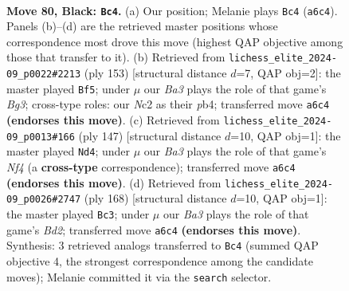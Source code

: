 \documentclass[11pt]{article}
\begin{document}
\clearpage

\begin{figure}[p]\centering
\begin{subfigure}{0.46\textwidth}\centering
\resizebox{\linewidth}{!}{%
\newchessgame
\chessboard[
  setfen={7k/8/b7/8/5B2/8/2n2P1K/8 b - - 6 80},
  showmover=false,
  pgfstyle=straightmove, color=movearrow, markmove={a6-c4}
]}
\caption{}
\end{subfigure}\hfill
\begin{subfigure}{0.46\textwidth}\centering
\resizebox{\linewidth}{!}{%
\newchessgame
\chessboard[
  setfen={8/4B3/3K2b1/1p6/1P6/8/8/k7 b - - 31 77},
  showmover=false,
  pgfstyle=straightmove, color=movearrow, markmove={g6-f5}
]}
\caption{}
\end{subfigure}
\\[4pt]
\begin{subfigure}{0.46\textwidth}\centering
\resizebox{\linewidth}{!}{%
\newchessgame
\chessboard[
  setfen={4K3/5B2/8/5n2/8/8/3k4/8 b - - 5 74},
  showmover=false,
  pgfstyle=straightmove, color=movearrow, markmove={f5-d4}
]}
\caption{}
\end{subfigure}\hfill
\begin{subfigure}{0.46\textwidth}\centering
\resizebox{\linewidth}{!}{%
\newchessgame
\chessboard[
  setfen={2b5/3k4/8/8/8/8/3B1K2/8 w - - 53 85},
  showmover=false,
  pgfstyle=straightmove, color=movearrow, markmove={d2-c3}
]}
\caption{}
\end{subfigure}
\caption{\textbf{Move 80, Black: \texttt{Bc4}.} (a) Our position; Melanie plays \texttt{Bc4} (\texttt{a6c4}). Panels (b)--(d) are the retrieved master positions whose correspondence most drove this move (highest QAP objective among those that transfer to it). (b) Retrieved from \texttt{lichess\_elite\_2024-09\_p0022\#2213} (ply 153) [structural distance $d$=7, QAP obj=2]: the master played \texttt{Bf5}; under $\mu$ our \emph{Ba3} plays the role of that game's \emph{Bg3}; cross-type roles: our \emph{N}c2 as their \emph{p}b4; transferred move \texttt{a6c4} \textbf{(endorses this move)}. (c) Retrieved from \texttt{lichess\_elite\_2024-09\_p0013\#166} (ply 147) [structural distance $d$=10, QAP obj=1]: the master played \texttt{Nd4}; under $\mu$ our \emph{Ba3} plays the role of that game's \emph{Nf4} (a \textbf{cross-type} correspondence); transferred move \texttt{a6c4} \textbf{(endorses this move)}. (d) Retrieved from \texttt{lichess\_elite\_2024-09\_p0026\#2747} (ply 168) [structural distance $d$=10, QAP obj=1]: the master played \texttt{Bc3}; under $\mu$ our \emph{Ba3} plays the role of that game's \emph{Bd2}; transferred move \texttt{a6c4} \textbf{(endorses this move)}. Synthesis: 3 retrieved analogs transferred to \texttt{Bc4} (summed QAP objective 4, the strongest correspondence among the candidate moves); Melanie committed it via the \texttt{search} selector.}
\label{fig:thought-m159}
\end{figure}
\end{document}
